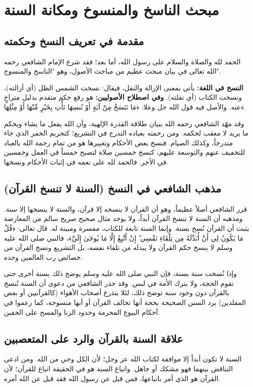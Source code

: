\chapter{مبحث الناسخ والمنسوخ ومكانة السنة}

\section{مقدمة في تعريف النسخ وحكمته}
الحمد لله والصلاة والسلام على رسول الله، أما بعد؛ فقد شرع الإمام الشافعي رحمه الله تعالى في بيان مبحث عظيم من مباحث الأصول، وهو "الناسخ والمنسوخ".

\textbf{النسخ في اللغة:} يأتي بمعنى الإزالة والنقل، فيقال: نسخت الشمس الظل (أي أزالته)، ونسخت الكتاب (أي نقلته). 
\textbf{وفي اصطلاح الأصوليين:} هو رفع حكم متقدم بدليل متراخٍ عنه. والأصل فيه قول الله جل وعلا: ﴿مَا نَنَسَخْ مِنْ آيَةٍ أَوْ نُنسِهَا نَأْتِ بِخَيْرٍ مِّنْهَا أَوْ مِثْلِهَا﴾.

وقد مهّد الشافعي رحمه الله ببيان طلاقة القدرة الإلهية، وأن الله يفعل ما يشاء ويحكم ما يريد لا معقب لحكمه. ومن رحمته بعباده التدرج في التشريع؛ كتحريم الخمر الذي جاء متدرجاً، وكذلك الصيام. فنسخ بعض الأحكام وتغييرها هو من تمام رحمة الله بالعباد للتخفيف عنهم والتوسعة عليهم، كنسخ خمسين صلاة لتصبح خمساً في العمل وخمسين في الأجر. فالحمد لله على نعمه في إثبات الأحكام ونسخها.

\section{مذهب الشافعي في النسخ (السنة لا تنسخ القرآن)}
قرر الشافعي أصلاً عظيماً، وهو أن القرآن لا ينسخه إلا قرآن، والسنة لا ينسخها إلا سنة. ومذهبه أن السنة لا تنسخ القرآن أبداً، ولا يوجد مثال صحيح صريح سالم من المعارضة يثبت أن القرآن نُسخ بسنة.
وإنما السنة تابعة للكتاب، مفسرة ومبينة له. قال تعالى: ﴿قُلْ مَا يَكُونُ لِي أَنْ أُبَدِّلَهُ مِن تِلْقَاءِ نَفْسِي ۖ إِنْ أَتَّبِعُ إِلَّا مَا يُوحَىٰ إِلَيَّ﴾، فالنبي صلى الله عليه وسلم لا ينسخ حكم القرآن ولا يبدله من تلقاء نفسه، بل التشريع ونسخ القرآن من خصائص رب العالمين وحده.

وإذا نُسخت سنة بسنة، فإن النبي صلى الله عليه وسلم يوضح ذلك بسنة أخرى حتى تقوم الحجة، ولا يترك الأمة في لبس. وقد حذر الشافعي من دعوى أن السنة تُنسخ بالقرآن دون وجود سنة توضح ذلك، لئلا يتذرع أصحاب الأهواء (كالقرآنيين أو بعض المقلدين) برد السنن الصحيحة بحجة أنها تخالف القرآن أو أنها منسوخة، كما زعموا في أحكام البيوع المحرمة وحدود الزنا والمسح على الخفين.

\section{علاقة السنة بالقرآن والرد على المتعصبين}
السنة لا تكون أبداً إلا موافقة لكتاب الله عز وجل؛ لأن الكل وحي من الله. ومن ادعى التناقض بينهما فهو مشكك أو جاهل. واتباع السنة هو في الحقيقة اتباع للقرآن؛ لأن القرآن هو الذي أمر باتباعها، فمن قبل عن رسول الله فقد قبل عن الله أمره.

